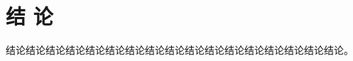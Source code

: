 \backmatter
\chapter*{结\texorpdfstring{\qquad}{} 论}
\thispagestyle{main}

结论结论结论结论结论结论结论结论结论结论结论结论结论结论结论结论结论。
